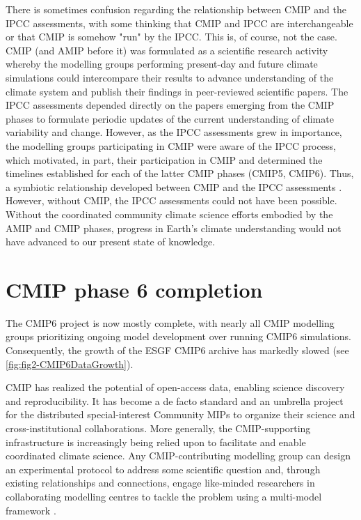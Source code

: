 \documentclass[manuscript]{copernicus}
\newcommand{\mycomment}[1]{}
\begin{document}
There is sometimes confusion regarding the relationship between CMIP and the IPCC assessments, with some thinking that CMIP and IPCC are interchangeable or that CMIP is somehow "run" by the IPCC. This is, of course, not the case. CMIP (and AMIP before it) was formulated as a scientific research activity whereby the modelling groups performing present-day and future climate simulations could intercompare their results to advance understanding of the climate system and publish their findings in peer-reviewed scientific papers. The IPCC assessments depended directly on the papers emerging from the CMIP phases to formulate periodic updates of the current understanding of climate variability and change. However, as the IPCC assessments grew in importance, the modelling groups participating in CMIP were aware of the IPCC process, which motivated, in part, their participation in CMIP and determined the timelines established for each of the latter CMIP phases (CMIP5, CMIP6). Thus, a symbiotic relationship developed between CMIP and the IPCC assessments \citep{meehl_role_2023}. However, without CMIP, the IPCC assessments could not have been possible. Without the coordinated community climate science efforts embodied by the AMIP and CMIP phases, progress in Earth's climate understanding would not have advanced to our present state of knowledge.

\mycomment{
CMIP6 30 data nodes publishing data, 9 reporting download statistics
CMIP5 $\sim$35 data nodes publishing, 7 reporting download statistics (all CMIP6 data nodes)
}


\section{CMIP phase 6 completion}
\label{sec:CMIP6Completion}

The CMIP6 project is now mostly complete, with nearly all CMIP modelling groups prioritizing ongoing model development over running CMIP6 simulations. Consequently, the growth of the ESGF CMIP6 archive has markedly slowed (see \autoref{fig:fig2-CMIP6DataGrowth}).

CMIP has realized the potential of open-access data, enabling science discovery and reproducibility. It has become a de facto standard and an umbrella project for the distributed special-interest Community MIPs to organize their science and cross-institutional collaborations. More generally, the CMIP-supporting infrastructure is increasingly being relied upon to facilitate and enable coordinated climate science. Any CMIP-contributing modelling group can design an experimental protocol to address some scientific question and, through existing relationships and connections, engage like-minded researchers in collaborating modelling centres to tackle the problem using a multi-model framework \citep[e.g.][]{jones_bringing_2024}.
\end{document}
